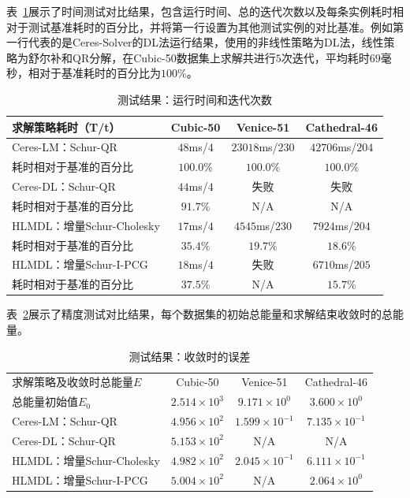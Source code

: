 表~\ref{tab:time}展示了时间测试对比结果，包含运行时间、总的迭代次数以及每条实例耗时相对于测试基准耗时的百分比，并将第一行设置为其他测试实例的对比基准。例如第一行代表的是Ceres-Solver的DL法运行结果，使用的非线性策略为DL法，线性策略为舒尔补和QR分解，在Cubic-50数据集上求解共进行$5$次迭代，平均耗时$69$毫秒，相对于基准耗时的百分比为$100\%$。

{
\linespread{1}
\begin{table}[htb!]
\caption{测试结果：运行时间和迭代次数}
\label{tab:time}
\centering
\begin{tabular}[b]{l|ccc}
    \toprule
    求解策略耗时（T/t）       &   Cubic-50 &       Venice-51 &    Cathedral-46 \\ \midrule
    Ceres-LM：Schur-QR        & $48$ms/$4$ & $23018$ms/$230$ & $42706$ms/$204$ \\
    耗时相对于基准的百分比    &  $100.0\%$ &       $100.0\%$ &       $100.0\%$ \\ \midrule
    Ceres-DL：Schur-QR        & $44$ms/$4$ &            失败 &            失败 \\
    耗时相对于基准的百分比    &   $91.7\%$ &             N/A &             N/A \\ \midrule
    HLMDL：增量Schur-Cholesky & $17$ms/$4$ &  $4545$ms/$230$ &  $7924$ms/$204$ \\
    耗时相对于基准的百分比    &   $35.4\%$ &        $19.7\%$ &        $18.6\%$ \\ \midrule
    HLMDL：增量Schur-I-PCG    & $18$ms/$4$ &            失败 &  $6710$ms/$205$ \\
    耗时相对于基准的百分比    &   $37.5\%$ &             N/A &        $15.7\%$ \\
    \bottomrule
\end{tabular}
\end{table}
}

表~\ref{tab:energy}展示了精度测试对比结果，每个数据集的初始总能量和求解结束收敛时的总能量。

{
\linespread{1}
\begin{table}[htb!]
\caption{测试结果：收敛时的误差}
\label{tab:energy}
\centering
\begin{tabular}[b]{l|ccc}
    \toprule
    求解策略及收敛时总能量$E$ &          Cubic-50 &            Venice-51 &         Cathedral-46 \\
    总能量初始值$E_0$         & $2.514\times10^3$ &  $9.171\times10^{0}$ &  $3.600\times10^{0}$ \\ \midrule
    Ceres-LM：Schur-QR        & $4.956\times10^2$ & $1.599\times10^{-1}$ & $7.135\times10^{-1}$ \\
    Ceres-DL：Schur-QR        & $5.153\times10^2$ &                  N/A &                  N/A \\
    HLMDL：增量Schur-Cholesky & $4.982\times10^2$ & $2.045\times10^{-1}$ & $6.111\times10^{-1}$ \\
    HLMDL：增量Schur-I-PCG    & $5.004\times10^2$ &                  N/A &  $2.064\times10^{0}$ \\
    \bottomrule
\end{tabular}
\end{table}
}

